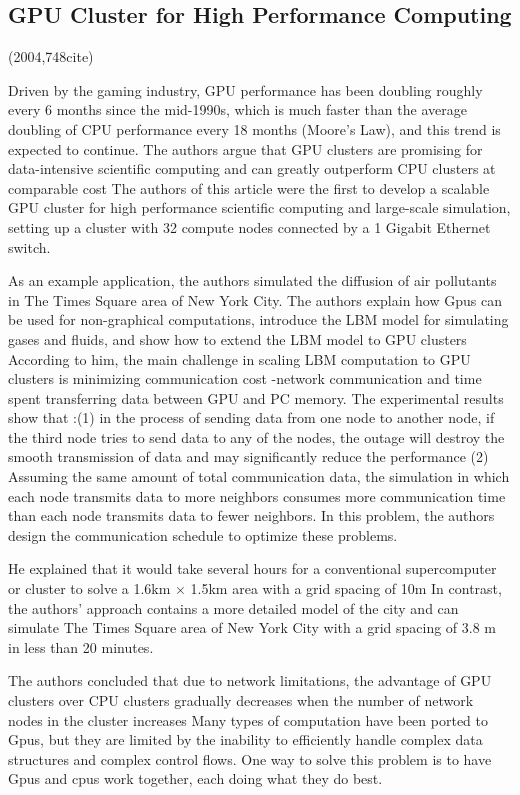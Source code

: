 \documentclass[a4paper,twoside]{scrbook}
\begin{document}
\subsection{GPU Cluster for High Performance Computing \cite{fan2004gpu}}
(2004,748cite)\par
Driven by the gaming industry, GPU performance has been doubling roughly every 6 months since the mid-1990s, which is much faster than the average doubling of CPU performance every 18 months (Moore's Law), and this trend is expected to continue.
The authors argue that GPU clusters are promising for data-intensive scientific computing and can greatly outperform CPU clusters at comparable cost
The authors of this article were the first to develop a scalable GPU cluster for high performance scientific computing and large-scale simulation, setting up a cluster with 32 compute nodes connected by a 1 Gigabit Ethernet switch.
\par
As an example application, the authors simulated the diffusion of air pollutants in The Times Square area of New York City.
The authors explain how Gpus can be used for non-graphical computations, introduce the LBM model for simulating gases and fluids, and show how to extend the LBM model to GPU clusters
According to him, the main challenge in scaling LBM computation to GPU clusters is minimizing communication cost -network communication and time spent transferring data between GPU and PC memory.
The experimental results show that :(1) in the process of sending data from one node to another node, if the third node tries to send data to any of the nodes, the outage will destroy the smooth transmission of data and may significantly reduce the performance
(2) Assuming the same amount of total communication data, the simulation in which each node transmits data to more neighbors consumes more communication time than each node transmits data to fewer neighbors.
In this problem, the authors design the communication schedule to optimize these problems.
\par
He explained that it would take several hours for a conventional supercomputer or cluster to solve a 1.6km × 1.5km area with a grid spacing of 10m
In contrast, the authors' approach contains a more detailed model of the city and can simulate The Times Square area of New York City with a grid spacing of 3.8 m in less than 20 minutes.
\par
The authors concluded that due to network limitations, the advantage of GPU clusters over CPU clusters gradually decreases when the number of network nodes in the cluster increases
Many types of computation have been ported to Gpus, but they are limited by the inability to efficiently handle complex data structures and complex control flows. One way to solve this problem is to have Gpus and cpus work together, each doing what they do best.
\end{document}

